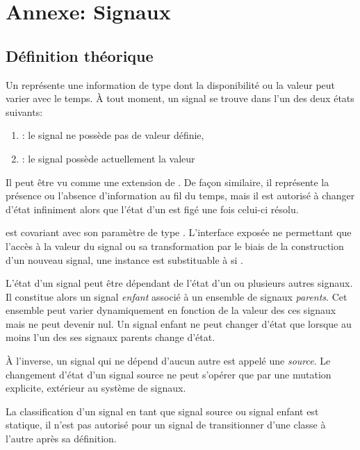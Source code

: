 \chapter{Annexe: Signaux}

\section{Définition théorique}
	
	Un  représente une information de type  dont la disponibilité ou la valeur peut varier avec le temps.
	À tout moment, un signal se trouve dans l'un des deux états suivants:
	\begin{enumerate}
		\item {}: le signal ne possède pas de valeur définie,
		\item {}: le signal possède actuellement la valeur 
	\end{enumerate}

	Il peut être vu comme une extension de . De façon similaire, il représente la présence ou l'absence d'information au fil du temps, mais il est autorisé à changer d'état infiniment alors que l'état d'un  est figé une fois celui-ci résolu.
	
	 est covariant avec son paramètre de type . L'interface exposée ne permettant que l'accès à la valeur du signal ou sa transformation par le biais de la construction d'un nouveau signal, une instance  est substituable à  si .
	
	L'état d'un signal peut être dépendant de l'état d'un ou plusieurs autres signaux. Il constitue alors un signal \emph{enfant} associé à un ensemble de signaux \emph{parents}. Cet ensemble peut varier dynamiquement en fonction de la valeur des ces signaux mais ne peut devenir nul. Un signal enfant ne peut changer d'état que lorsque au moins l'un des ses signaux parents change d'état.
	
	À l'inverse, un signal qui ne dépend d'aucun autre est appelé une \emph{source}. Le changement d'état d'un signal source ne peut s'opérer que par une mutation explicite, extérieur au système de signaux.
	
	La classification d'un signal en tant que signal source ou signal enfant est statique, il n'est pas autorisé pour un signal de transitionner d'une classe à l'autre après sa définition.
	
